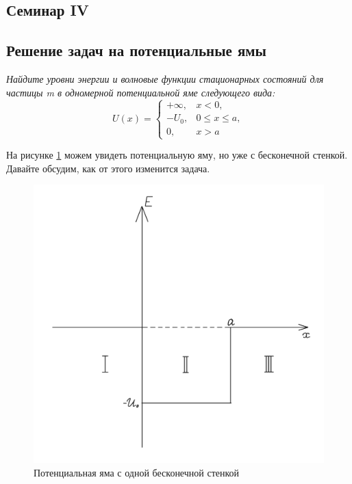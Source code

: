 \begin{center}
    \section{Семинар IV}
\end{center}
\subsection{Решение задач на потенциальные ямы}
\begin{center}
    \textit{Найдите уровни энергии и волновые функции стационарных состояний для частицы m в одномерной потенциальной яме следующего вида:}
    \[
    U(x) =
    \begin{cases}
    +\infty,& x<0,\\
    -U_0,& 0 \leq x \leq a,\\
    0,& x>a
    \end{cases}
    \]
\end{center}

На рисунке \ref{fig 4.1} можем увидеть потенциальную яму, но уже с бесконечной стенкой. Давайте обсудим, как от этого изменится задача.
\begin{figure}[!ht]
\centering
\includegraphics[scale=0.27]{class_4/images/half-inf hole.png}
\caption{Потенциальная яма с одной бесконечной стенкой}
\label{fig 4.1}
\end{figure}

